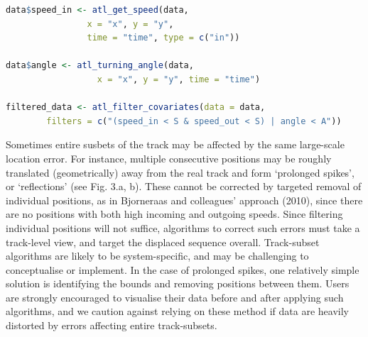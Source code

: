 \documentclass[10pt,paper=a4,headings=standardclasses
]{scrartcl}
\begin{document}
\begin{lstlisting}[float, language=R, style=customR, caption = {
    Filtering a movement track on incoming and outgoing speeds, and on turning angle to remove unrealistic movement.
    The functions \texttt{atl\_get\_speed} and \texttt{atl\_turning\_angle} are used to get the speeds and turning angles before filtering, and assigned to a column in the data (assignment of \texttt{speed\_out} is not shown).
    The filter step only retains positions with speeds below the speed threshold $S$ \textit{or} angles above the turning angle threshold $\theta$, i.e., positions where the animal is slow but makes sharp turns, and data where the animal moves quickly in a relatively straight line.}]
data$speed_in <- atl_get_speed(data,
                x = "x", y = "y",
                time = "time", type = c("in"))

data$angle <- atl_turning_angle(data,
                  x = "x", y = "y", time = "time")

filtered_data <- atl_filter_covariates(data = data,
        filters = c("(speed_in < S & speed_out < S) | angle < A"))
\end{lstlisting}

Sometimes entire susbets of the track may be affected by the same large-scale location error.
For instance, multiple consecutive positions may be roughly translated (geometrically) away from the real track and form `prolonged spikes', or `reflections' (see Fig. 3.a, b).
These cannot be corrected by targeted removal of individual positions, as in Bjorneraas and colleagues' approach (2010), since there are no positions with both high incoming and outgoing speeds.
Since filtering individual positions will not suffice, algorithms to correct such errors must take a track-level view, and target the displaced sequence overall.
Track-subset algorithms are likely to be system-specific, and may be challenging to conceptualise or implement.
In the case of prolonged spikes, one relatively simple solution is identifying the bounds and removing positions between them.
Users are strongly encouraged to visualise their data before and after applying such algorithms, and we caution against relying on these method if data are heavily distorted by errors affecting entire track-subsets.
\end{document}
